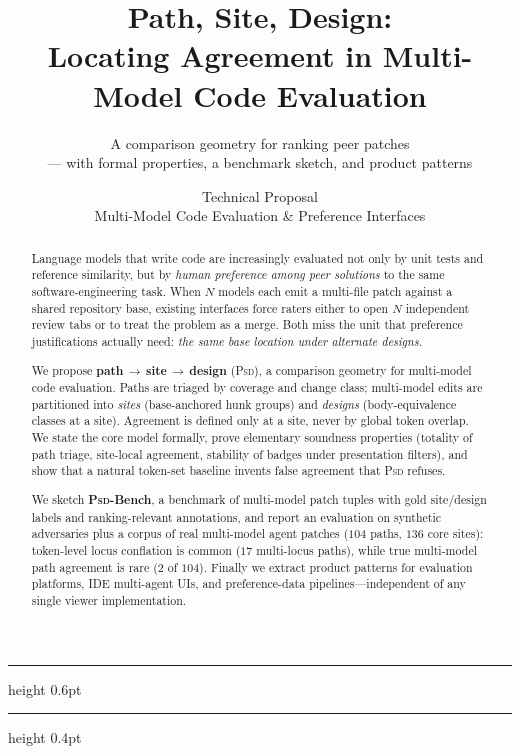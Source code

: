 \documentclass[
  11pt,
  a4paper,
  oneside,
  numbers=noenddot,
  abstract=true,
  headings=normal,
  DIV=11,
  BCOR=0mm,
]{scrartcl}
\title{Path, Site, Design:\\
Locating Agreement in Multi-Model Code Evaluation}
\subtitle{A comparison geometry for ranking peer patches\\
--- with formal properties, a benchmark sketch, and product patterns}
\author{Technical Proposal\\[0.35em]
{\normalsize Multi-Model Code Evaluation \& Preference Interfaces}}
\date{}
\theoremstyle{definition}
\theoremstyle{plain}
\theoremstyle{remark}
\newcommand{\PathSiteDesign}{\textbf{path\,$\rightarrow$\,site\,$\rightarrow$\,design}}
\newcommand{\PSD}{\textsc{Psd}}
\begin{document}
\maketitle
\thispagestyle{plain}

\vspace{-1.1em}
{\color{rulegray}\hrule height 0.6pt}
\vspace{1.0em}

\begin{abstract}
Language models that write code are increasingly evaluated not only by
unit tests and reference similarity, but by \emph{human preference among
peer solutions} to the same software-engineering task. When $N$ models
each emit a multi-file patch against a shared repository base, existing
interfaces force raters either to open $N$ independent review tabs or to
treat the problem as a merge. Both miss the unit that preference
justifications actually need: \emph{the same base location under alternate
designs}.

We propose \PathSiteDesign{} (\PSD{}), a comparison geometry for
multi-model code evaluation. Paths are triaged by coverage and change
class; multi-model edits are partitioned into \emph{sites} (base-anchored
hunk groups) and \emph{designs} (body-equivalence classes at a site).
Agreement is defined only at a site, never by global token overlap. We
state the core model formally, prove elementary soundness properties
(totality of path triage, site-local agreement, stability of badges under
presentation filters), and show that a natural token-set baseline invents
false agreement that \PSD{} refuses.

We sketch \textbf{\PSD{}-Bench}, a benchmark of multi-model patch tuples
with gold site/design labels and ranking-relevant annotations, and report
an evaluation on synthetic adversaries plus a corpus of real multi-model
agent patches ($104$ paths, $136$ core sites): token-level locus conflation
is common ($17$ multi-locus paths), while true multi-model path agreement
is rare ($2$ of $104$). Finally we extract product patterns for evaluation
platforms, IDE multi-agent UIs, and preference-data pipelines---independent
of any single viewer implementation.
\end{abstract}

\vspace{0.5em}
{\color{rulegray}\hrule height 0.4pt}
\vspace{0.7em}

\tableofcontents
\clearpage

\end{document}
